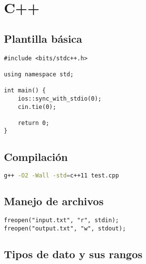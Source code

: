 \documentclass[10pt]{article}
\begin{document}
\tableofcontents

\newpage

\section{C++}

\subsection{Plantilla básica}

\begin{lstlisting}
#include <bits/stdc++.h>

using namespace std;

int main() {
    ios::sync_with_stdio(0);
    cin.tie(0);

    return 0;
}
\end{lstlisting}

\subsection{Compilación}

\begin{lstlisting}[language=bash]
g++ -O2 -Wall -std=c++11 test.cpp
\end{lstlisting}

\subsection{Manejo de archivos}

\begin{lstlisting}
freopen("input.txt", "r", stdin);
freopen("output.txt", "w", stdout);
\end{lstlisting}

\subsection{Tipos de dato y sus rangos}
\end{document}
